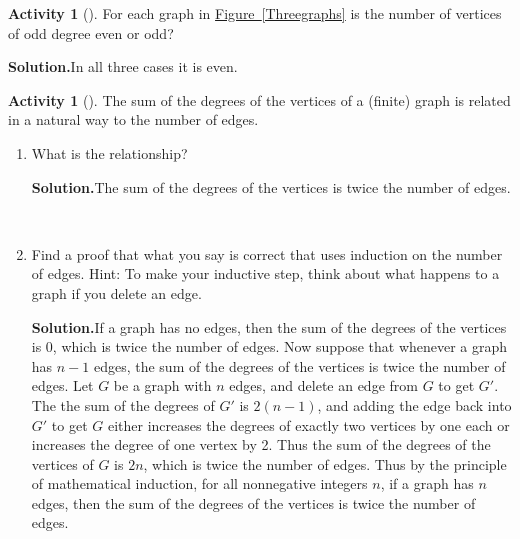 \documentclass[10pt,]{book}
\theoremstyle{plain}
\theoremstyle{definition}
\newtheorem{activity}[project]{Activity}
\numberwithin{equation}{chapter}
\begin{document}
\begin{activity}[]\label{activity-93}
For each graph in \hyperref[Threegraphs]{Figure~\ref{Threegraphs}} is the number of vertices of odd degree even or odd?%
\par\medskip\noindent%
\textbf{Solution.}\quad In all three cases it is even.%
\end{activity}
\begin{activity}[]\label{activity-94}
The sum of the degrees of the vertices of a (finite) graph is related in a natural way to the number of edges.%
~\par
\begin{enumerate}[label=(\alph*)]
 \item What is the relationship?%
\par\medskip\noindent%
\textbf{Solution.}\quad The sum of the degrees of the vertices is twice the number of edges.%

~\par
\item Find a proof that what you say is correct that uses induction on the number of edges.  Hint:  To make your inductive step, think about what happens to a graph if you delete an edge.%
\par\medskip\noindent%
\textbf{Solution.}\quad If a graph has no edges, then the sum of the degrees of the vertices is 0, which is twice the number of edges. Now suppose that whenever a graph has \(n-1\) edges, the sum of the degrees of the vertices is twice the number of edges. Let \(G\) be a graph with \(n\) edges, and delete an edge from \(G\) to get \(G'\). The the sum of the degrees of \(G'\) is \(2(n-1)\), and adding the edge back into \(G'\) to get \(G\) either increases the degrees of exactly two vertices by one each or increases the degree of one vertex by 2. Thus the sum of the degrees of the vertices of \(G\) is \(2n\), which is twice the number of edges. Thus by the principle of mathematical induction, for all nonnegative integers \(n\), if a graph has \(n\) edges, then the sum of the degrees of the vertices is twice the number of edges.%


\end{enumerate}
\end{activity}
\end{document}
